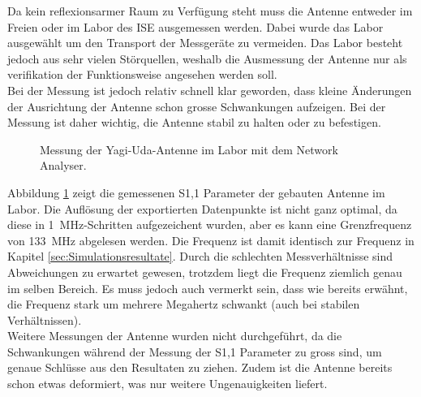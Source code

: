 Da kein reflexionsarmer Raum zu Verfügung steht muss die Antenne entweder im Freien oder im Labor des ISE ausgemessen werden. Dabei wurde das Labor ausgewählt um den Transport der Messgeräte zu vermeiden. Das Labor besteht jedoch aus sehr vielen Störquellen, weshalb die Ausmessung der Antenne nur als verifikation der Funktionsweise angesehen werden soll.\\
Bei der Messung ist jedoch relativ schnell klar geworden, dass kleine Änderungen der Ausrichtung der Antenne schon grosse Schwankungen aufzeigen. Bei der Messung ist daher wichtig, die Antenne stabil zu halten oder zu befestigen.

\newpage

\begin{figure}[!ht]
\centering
{}
\caption{Messung der Yagi-Uda-Antenne im Labor mit dem Network Analyser.}
\label{fig:Messung_S11}
\end{figure}

Abbildung \ref{fig:Messung_S11} zeigt die gemessenen S1,1 Parameter der gebauten Antenne im Labor. Die Auflösung der exportierten Datenpunkte ist nicht ganz optimal, da diese in \SI{1}{MHz}-Schritten aufgezeichent wurden, aber es kann eine Grenzfrequenz von \SI{133}{MHz} abgelesen werden. Die Frequenz ist damit identisch zur Frequenz in Kapitel \ref{sec:Simulationsresultate}. Durch die schlechten Messverhältnisse sind Abweichungen zu erwartet gewesen, trotzdem liegt die Frequenz ziemlich genau im selben Bereich. Es muss jedoch auch vermerkt sein, dass wie bereits erwähnt, die Frequenz stark um mehrere Megahertz schwankt (auch bei stabilen Verhältnissen).\\

Weitere Messungen der Antenne wurden nicht durchgeführt, da die Schwankungen während der Messung der S1,1 Parameter zu gross sind, um genaue Schlüsse aus den Resultaten zu ziehen. Zudem ist die Antenne bereits schon etwas deformiert, was nur weitere Ungenauigkeiten liefert.
